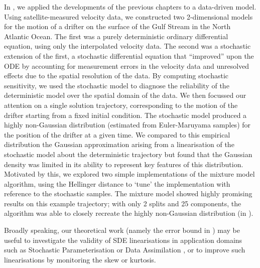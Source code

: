 In , we applied the developments of the previous chapters to a data-driven model.
Using satellite-measured velocity data, we constructed two 2-dimensional models for the motion of a drifter on the surface of the Gulf Stream in the North Atlantic Ocean.
The first was a purely deterministic ordinary differential equation, using only the interpolated velocity data.
The second was a stochastic extension of the first, a stochastic differential equation that ``improved'' upon the ODE by accounting for measurement errors in the velocity data and unresolved effects due to the spatial resolution of the data.
By computing stochastic sensitivity, we used the stochastic model to diagnose the reliability of the deterministic model over the spatial domain of the data.
We then focussed our attention on a single solution trajectory, corresponding to the motion of the drifter starting from a fixed initial condition.
The stochastic model produced a highly non-Gaussian distribution (estimated from Euler-Maruyama samples) for the position of the drifter at a given time.
We compared to this empirical distribution the Gaussian approximation arising from a linearisation of the stochastic model about the deterministic trajectory but found that the Gaussian density was limited in its ability to represent key features of this distribution.
Motivated by this, we explored two simple implementations of the mixture model algorithm, using the Hellinger distance to `tune' the implementation with reference to the stochastic samples.
The mixture model showed highly promising results on this example trajectory; with only 2 splits and 25 components, the algorithm was able to closely recreate the highly non-Gaussian distribution (in ).

Broadly speaking, our theoretical work (namely the error bound in ) may be useful to investigate the validity of SDE linearisations in application domains such as Stochastic Parameterisation \citep{BernerEtAl_2017_StochasticParameterizationNew,Palmer_2019_StochasticWeatherClimate,LeutbecherEtAl_2017_StochasticRepresentationsModel} or Data Assimilation \citep{BudhirajaEtAl_2019_AssimilatingDataModels,ReichCotter_2015_ProbabilisticForecastingBayesian,LawEtAl_2015_DataAssimilationMathematical}, or to improve such linearisations by monitoring the skew or kurtosis.



